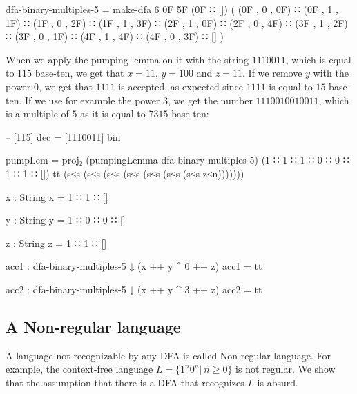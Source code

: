 \begin{agda}
dfa-binary-multiples-5 = make-dfa 6 0F 5F (0F ∷ []) (
        (0F , 0 , 0F)
      ∷ (0F , 1 , 1F)
      ∷ (1F , 0 , 2F)
      ∷ (1F , 1 , 3F)
      ∷ (2F , 1 , 0F)
      ∷ (2F , 0 , 4F)
      ∷ (3F , 1 , 2F)
      ∷ (3F , 0 , 1F)
      ∷ (4F , 1 , 4F)
      ∷ (4F , 0 , 3F)
      ∷ []
    )
\end{agda}
When we apply the pumping lemma on it with the string $1110011$, which is equal to $115$ base-ten, we get that $x = 11$, $y = 100$ and $z = 11$. If we remove $y$ with the power $0$, we get that $1111$ is accepted, as expected since $1111$ is equal to $15$ base-ten. If we use for example the power $3$, we get the number $1110010010011$, which is a multiple of $5$ as it is equal to $7315$ base-ten:
\begin{agda}

-- [115] dec = [1110011] bin

pumpLem = proj₂
            (pumpingLemma dfa-binary-multiples-5)
            (1 ∷ 1 ∷ 1 ∷ 0 ∷ 0 ∷ 1 ∷ 1 ∷ [])
            tt
            (s≤s (s≤s (s≤s (s≤s (s≤s (s≤s (s≤s z≤n)))))))

x : String
x = 1 ∷ 1 ∷ []

y : String
y = 1 ∷ 0 ∷ 0 ∷ []

z : String
z = 1 ∷ 1 ∷ []

acc1 : dfa-binary-multiples-5 ↓ (x ++ y ^ 0 ++ z)
acc1 = tt

acc2 : dfa-binary-multiples-5 ↓ (x ++ y ^ 3 ++ z)
acc2 = tt
\end{agda}
\subsection{A Non-regular language}
A language not recognizable by any DFA is called Non-regular language. For example, the context-free language $L = \{1^n0^n |\ n \ge 0\}$ is not regular. We show that the assumption that there is a DFA that recognizes $L$ is absurd.

